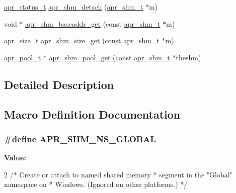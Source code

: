 \begin{DoxyCompactItemize}
\item 
\hyperlink{group__apr__errno_gaf76ee4543247e9fb3f3546203e590a6c}{apr\+\_\+status\+\_\+t} \hyperlink{group__apr__shm_ga900095a06d3fdb4cdd04ca4449a9d42a}{apr\+\_\+shm\+\_\+detach} (\hyperlink{group__apr__shm_ga79e8c16bdeaf7ade4ef0f935249e7c2f}{apr\+\_\+shm\+\_\+t} $\ast$m)
\item 
void $\ast$ \hyperlink{group__apr__shm_gade739e1f5f4e88c93256a63ebfd47d4d}{apr\+\_\+shm\+\_\+baseaddr\+\_\+get} (const \hyperlink{group__apr__shm_ga79e8c16bdeaf7ade4ef0f935249e7c2f}{apr\+\_\+shm\+\_\+t} $\ast$m)
\item 
apr\+\_\+size\+\_\+t \hyperlink{group__apr__shm_ga557ae85d3f225620a77ad80caeaacac7}{apr\+\_\+shm\+\_\+size\+\_\+get} (const \hyperlink{group__apr__shm_ga79e8c16bdeaf7ade4ef0f935249e7c2f}{apr\+\_\+shm\+\_\+t} $\ast$m)
\item 
\hyperlink{group__apr__pools_gaf137f28edcf9a086cd6bc36c20d7cdfb}{apr\+\_\+pool\+\_\+t} $\ast$ \hyperlink{group__apr__shm_ga072c40df7643e697885935ae65545098}{apr\+\_\+shm\+\_\+pool\+\_\+get} (const \hyperlink{group__apr__shm_ga79e8c16bdeaf7ade4ef0f935249e7c2f}{apr\+\_\+shm\+\_\+t} $\ast$theshm)
\end{DoxyCompactItemize}


\subsection{Detailed Description}


\subsection{Macro Definition Documentation}
\subsubsection[{\texorpdfstring{A\+P\+R\+\_\+\+S\+H\+M\+\_\+\+N\+S\+\_\+\+G\+L\+O\+B\+AL}{APR_SHM_NS_GLOBAL}}]{\setlength{\rightskip}{0pt plus 5cm}\#define A\+P\+R\+\_\+\+S\+H\+M\+\_\+\+N\+S\+\_\+\+G\+L\+O\+B\+AL}\hypertarget{group__apr__shm_ga0de8e4acab42e7ff8e35e5ac9620f667}{}\label{group__apr__shm_ga0de8e4acab42e7ff8e35e5ac9620f667}
{\bfseries Value\+:}
\begin{DoxyCode}
2 \textcolor{comment}{/* Create or attach to named shared memory}
\textcolor{comment}{                               * segment in the "Global" namespace on}
\textcolor{comment}{                               * Windows.  (Ignored on other platforms.)}
\textcolor{comment}{                               */}
\end{DoxyCode}
